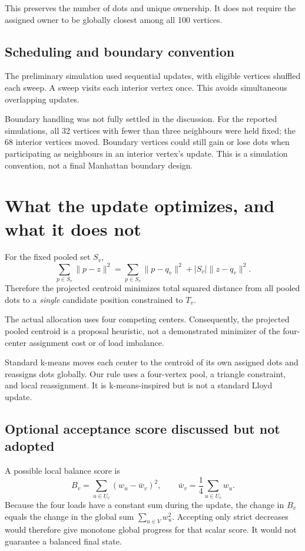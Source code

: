 \documentclass[11pt]{article}
\begin{document}
This preserves the number of dots and unique ownership. It does not require the assigned owner to be globally closest among all 100 vertices.

\subsection{Scheduling and boundary convention}
The preliminary simulation used sequential updates, with eligible vertices shuffled each sweep. A sweep visits each interior vertex once. This avoids simultaneous overlapping updates.

Boundary handling was not fully settled in the discussion. For the reported simulations, all 32 vertices with fewer than three neighbours were held fixed; the 68 interior vertices moved. Boundary vertices could still gain or lose dots when participating as neighbours in an interior vertex's update. This is a simulation convention, not a final Manhattan boundary design.

\section{What the update optimizes, and what it does not}
For the fixed pooled set $S_v$,
\[
\sum_{p\in S_v}\|p-z\|^2
=\sum_{p\in S_v}\|p-q_v\|^2+|S_v|\|z-q_v\|^2.
\]
Therefore the projected centroid minimizes total squared distance from all pooled dots to a \emph{single} candidate position constrained to $T_v$.

The actual allocation uses four competing centers. Consequently, the projected pooled centroid is a proposal heuristic, not a demonstrated minimizer of the four-center assignment cost or of load imbalance.

Standard k-means moves each center to the centroid of its own assigned dots and reassigns dots globally. Our rule uses a four-vertex pool, a triangle constraint, and local reassignment. It is k-means-inspired but is not a standard Lloyd update.

\subsection{Optional acceptance score discussed but not adopted}
A possible local balance score is
\[
B_v=\sum_{u\in U_v}(w_u-\bar w_v)^2,
\qquad
\bar w_v=\frac{1}{4}\sum_{u\in U_v}w_u.
\]
Because the four loads have a constant sum during the update, the change in $B_v$ equals the change in the global sum $\sum_{u\in V}w_u^2$. Accepting only strict decreases would therefore give monotone global progress for that scalar score. It would not guarantee a balanced final state.
\end{document}
